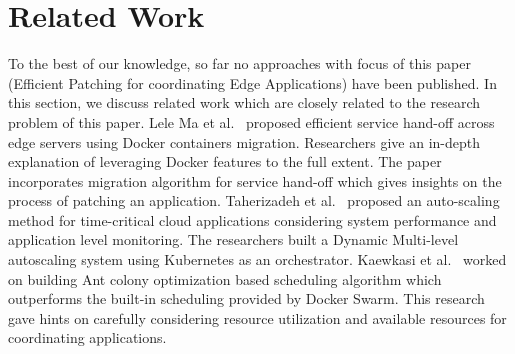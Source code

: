 \section{Related Work}
To the best of our knowledge, so far no approaches with focus of this paper (Efficient Patching for coordinating Edge Applications) have been published. In this section, we discuss related work which are closely related to the research problem of this paper. Lele Ma et al.~\cite{service_handoff} proposed efficient service hand-off across edge servers using Docker containers migration. Researchers give an in-depth explanation of leveraging Docker features to the full extent. The paper incorporates migration algorithm for service hand-off which gives insights on the process of patching an application. Taherizadeh et al.~\cite{dml_scaling} proposed an auto-scaling method for time-critical cloud applications considering system performance and application level monitoring. The researchers built a Dynamic Multi-level autoscaling system using Kubernetes as an orchestrator. Kaewkasi et al.~\cite{7886112} worked on building Ant colony optimization based scheduling algorithm which outperforms the built-in scheduling provided by Docker Swarm. This research gave hints on carefully considering resource utilization and available resources for coordinating applications.

